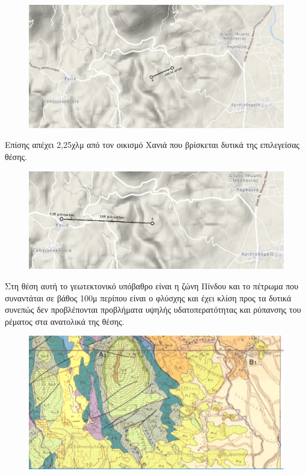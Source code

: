 \documentclass[12pt]{article}
\begin{document}
 	\begin{figure} [H]
 		\begin{center}
 			\includegraphics [scale = 0.95] {map48.png}
 		\end{center}
 	\end{figure}
 
 	Επίσης απέχει 2,25χλμ από τον οικισμό Χανιά που βρίσκεται δυτικά της επιλεγείσας θέσης.
 	
 	\begin{figure} [H]
 		\begin{center}
 			\includegraphics [scale = 0.65] {map49.png}
 		\end{center}
 	\end{figure}
 
 	Στη θέση αυτή το γεωτεκτονικό υπόβαθρο είναι η ζώνη Πίνδου και το πέτρωμα που συναντάται σε βάθος 100μ περίπου είναι ο φλύσχης και έχει κλίση προς τα δυτικά συνεπώς δεν προβλέπονται προβλήματα υψηλής υδατοπερατότητας και ρύπανσης του ρέματος στα ανατολικά της θέσης.
 	
 	\begin{figure} [H]
 		\begin{center}
 			\includegraphics [scale = 0.25] {map50.png}
 		\end{center}
 	\end{figure}
 
\end{document}
